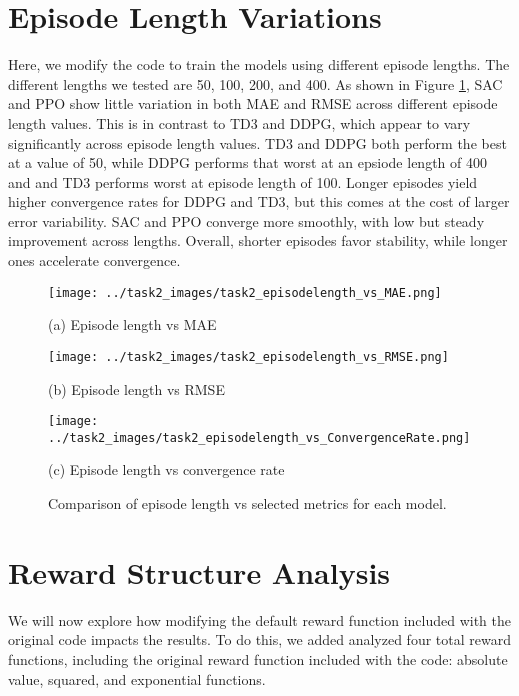\documentclass[11pt]{article}
\begin{document}
\section{Episode Length Variations}

Here, we modify the code to train the models using different episode lengths. The different lengths we tested are 50, 100, 200, and 400. As shown in Figure \ref{fig:eps_vs_metrics}, SAC and PPO show little variation in both MAE and RMSE across different episode length values. This is in contrast to TD3 and DDPG, which appear to vary significantly across episode length values. TD3 and DDPG both perform the best at a value of 50, while DDPG performs that worst at an epsiode length of 400 and and TD3 performs worst at episode length of 100. Longer episodes yield higher convergence rates for DDPG and TD3, but this comes at the cost of larger error variability. SAC and PPO converge more smoothly, with low but steady improvement across lengths. Overall, shorter episodes favor stability, while longer ones accelerate convergence.


\begin{figure}[h!]
  \centering
  \begin{minipage}[b]{0.49\textwidth}
    \texttt{[image: ../task2\_images/task2\_episodelength\_vs\_MAE.png]}
    \caption*{(a) Episode length vs MAE}
  \end{minipage}
  \hfill
  \begin{minipage}[b]{0.49\textwidth}
    \texttt{[image: ../task2\_images/task2\_episodelength\_vs\_RMSE.png]}
    \caption*{(b) Episode length vs RMSE}
  \end{minipage}
  \hfill
  \begin{minipage}[b]{0.49\textwidth}
    \texttt{[image: ../task2\_images/task2\_episodelength\_vs\_ConvergenceRate.png]}
    \caption*{(c) Episode length vs convergence rate}
  \end{minipage}
  \caption{Comparison of episode length vs selected metrics for each model.}
  \label{fig:eps_vs_metrics}
\end{figure}

\newpage
\section{Reward Structure Analysis}

We will now explore how modifying the default reward function included with the original code impacts the results.
To do this, we added analyzed four total reward functions, including the original reward function included with the code: absolute value, squared, and exponential functions.
\end{document}
